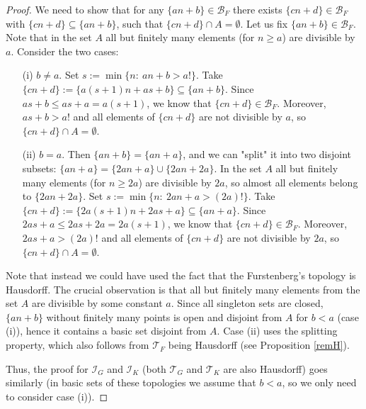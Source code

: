 \documentclass{amsart}
\theoremstyle{definition}
\theoremstyle{definition}
\newcommand{\I}{\mathcal I}
\newcommand{\T}{\mathcal{T}}
\newcommand{\B}{\mathcal{B}}
\begin{document}
\begin{proof}
We need to show that for any $\{an+b\} \in \B_F$ there exists $\{cn+d\} \in \B_F$ with $\{cn+d\} \subseteq \{an+b\}$, such that $\{cn+d\}\cap A = \emptyset$. Let us fix $\{an+b\} \in \B_F$. Note that in the set $A$ all but finitely many elements (for $n\geq a$) are divisible by $a$. Consider the two cases:
\begin{itemize}
 \item[(i)] $b\neq a$. Set $s:= \min \{n :\ an+b>a!\}$. Take $\{cn+d\} := \{a(s+1)n+as+b\} \subseteq \{an+b\}$. Since $as+b\leq as+a = a(s+1)$, we know that $\{cn+d\}\in \B_F$. Moreover, $as+b>a!$ and all elements of $\{cn+d\}$ are not divisible by $a$, so $\{cn+d\}\cap A = \emptyset$.
 \item[(ii)] $b=a$. Then $\{an+b\} = \{an+a\}$, and we can "split" it into two disjoint subsets: $\{an+a\} = \{2an+a\}\cup \{2an+2a\}$. In the set $A$ all but finitely many elements (for $n\geq 2a$) are divisible by $2a$, so almost all elements belong to $\{2an+2a\}$. Set $s:= \min \{n :\ 2an+a>(2a)!\}$. Take $\{cn+d\} := \{2a(s+1)n+2as+a\} \subseteq \{an+a\}$. Since $2as+a\leq 2as+2a = 2a(s+1)$, we know that $\{cn+d\}\in \B_F$. Moreover, $2as+a>(2a)!$ and all elements of $\{cn+d\}$ are not divisible by $2a$, so $\{cn+d\}\cap A = \emptyset$.
\end{itemize}

Note that instead we could have used the fact that the Furstenberg's topology is Hausdorff. The crucial observation is that all but finitely many elements from the set $A$ are divisible by some constant $a$. Since all singleton sets are closed, $\{an+b\}$ without finitely many points is open and disjoint from $A$ for $b<a$ (case (i)), hence it contains a basic set disjoint from $A$. Case (ii) uses the splitting property, which also follows from $\T_F$ being Hausdorff (see Proposition \ref{remH}).

Thus, the proof for $\I_G$ and $\I_K$ (both $\T_G$ and $\T_K$ are also Hausdorff) goes similarly (in basic sets of these topologies we assume that $b<a$, so we only need to consider case (i)).
\end{proof}

\end{document}
